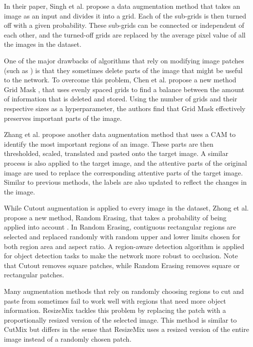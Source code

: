 In their paper, Singh et al. \cite{singhHideandSeekDataAugmentation2018} propose a data augmentation method that takes an image as an input and divides it into a grid. Each of the sub-grids is then turned off with a given probability. These sub-grids can be connected or independent of each other, and the turned-off grids are replaced by the average pixel value of all the images in the dataset.

One of the major drawbacks of algorithms that rely on modifying image patches (such as \cite{singhHideandSeekDataAugmentation2018,devriesImprovedRegularizationConvolutional2017,zhongRandomErasingData2020}) is that they sometimes delete parts of the image that might be useful to the network. To overcome this problem, Chen et al. propose a new method Grid Mask \cite{chenGridMaskDataAugmentation2020}, that uses evenly spaced grids to find a balance between the amount of information that is deleted and stored. Using the number of grids and their respective sizes as a hyperparameter, the authors find that Grid Mask effectively preserves important parts of the image.

Zhang et al. propose another data augmentation method that uses a CAM \cite{zhouLearningDeepFeatures2016} to identify the most important regions of an image. These parts are then thresholded, scaled, translated and pasted onto the target image. A similar process is also applied to the target image, and the attentive parts of the original image are used to replace the corresponding attentive parts of the target image. Similar to previous methods, the labels are also updated to reflect the changes in the image.

While Cutout augmentation \cite{devriesImprovedRegularizationConvolutional2017} is applied to every image in the dataset, Zhong et al. propose a new method, Random Erasing, that takes a probability of being applied into account \cite{zhongRandomErasingData2020}. In Random Erasing, contiguous rectangular regions are selected and replaced randomly with random upper and lower limits chosen for both region area and aspect ratio. A region-aware detection algorithm is applied for object detection tasks to make the network more robust to occlusion. Note that Cutout removes square patches, while Random Erasing removes square or rectangular patches.

Many augmentation methods that rely on randomly choosing regions to cut and paste from sometimes fail to work well with regions that need more object information. ResizeMix \cite{qinResizeMixMixingData2020} tackles this problem by replacing the patch with a proportionally resized version of the selected image. This method is similar to CutMix \cite{yunCutMixRegularizationStrategy2019} but differs in the sense that ResizeMix uses a resized version of the entire image instead of a randomly chosen patch.

